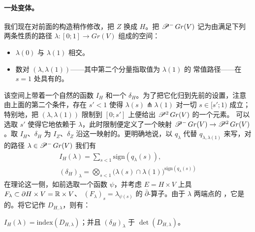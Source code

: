 \paragraph{一处变体。}\label{sub:a-variation}
我们现在对前面的构造稍作修改，把\trStrip{} $Z$ 换成\trUpperHalfPlane{} $H$。把
$\mathscr{P}^-\,Gr(V)$ 记为由满足下列两条性质的路径
$\lambda\colon[0;1]\to Gr(V)$ 组成的空间：
\begin{itemize}
\item $\lambda(0)$ 与 $\lambda(1)$ \trTransverse{}相交。
\item 数对 $(\lambda,\lambda(1))$——其中第二个分量指取值为 $\lambda(1)$ 的
常值路径——在 $s=1$ 处具有\trNegativeDefinite{}的\trCrossingForm。
\end{itemize}
该空间上带着一个自然的\trLocallyConstant{}函数 $I_H$ 和一个\trLineBundle{}
$\delta_H$。为了把它化归到先前的设置，注意由上面的第二个条件，存在 $s'<1$ 使得
$\lambda(s)\pitchfork\lambda(1)$ 对一切 $s\in[s';1)$ 成立；特别地，把
$(\lambda,\lambda(1))$ 限制到 $[0;s']$ 上便给出 $\mathscr{P}^2\,Gr(V)$ 的一个元素。
可以选取 $s'$ 使得它\trSmooth{}地依赖于 $\lambda$，此时限制便定义了一个映射
$\mathscr{P}^-\,Gr(V)\to\mathscr{P}^2\,Gr(V)$。取 $I_H$、$\delta_H$ 为 $I_Z$、$\delta_Z$
沿这一映射的\trPullback。更明确地说，以 $q_\lambda$ 代替 $q_{\lambda,\lambda(1)}$
来写，对\trGeneric{}的路径 $\lambda\in\mathscr{P}^-\,Gr(V)$ 我们有
\begin{equation}\label{eq:halfplane-index-formula}
\begin{gathered}
I_H(\lambda)=\sum_{s<1}\mathrm{sign}(q_\lambda(s)),\\
(\delta_H)_\lambda=\bigotimes_{s<1}
\bigl(\lambda(s)\cap\lambda(1)\bigr)^{\mathrm{sign}(q_\lambda(s))}
\end{gathered}
\end{equation}
在\trIndex{}理论这一侧，如前选取一个函数 $\psi$，并考虑 $E=H\times V$ 上具%
\trBoundaryCondition{} $F_\lambda\subset\partial H\times V=\mathbb{R}\times V$、
$(F_\lambda)_s=\lambda_{\psi(s)}$ 的 $\bar\partial$-算子。由于 $\lambda$ 两端点的%
\trTransversality，它是\trNondegenerate{}的。将它记作 $D_{H,\lambda}$，则有：
\begin{lemma}\label{thm:halfplane-index-determinant}
$I_H(\lambda)=\mathrm{index}(D_{H,\lambda})$；并且 $(\delta_H)_\lambda$
\trCanonical\trIsomorphic{}于\trDeterminantLine{} $\det(D_{H,\lambda})$。
\end{lemma}
